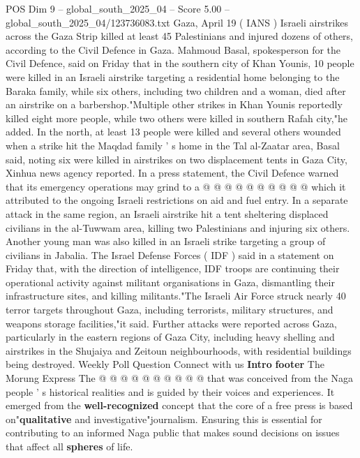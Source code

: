 \begin{textsample}{POS Dim 9 – global\_south\_2025\_04 – Score 5.00 – global\_south\_2025\_04/123736083.txt}  \label{ex:f9_pos_181}
Gaza, April 19 ( IANS ) Israeli airstrikes across the Gaza Strip killed at least 45 Palestinians and injured dozens of others, according to the Civil Defence in Gaza.
Mahmoud Basal, spokesperson for the Civil Defence, said on Friday that in the southern city of Khan Younis, 10 people were killed in an Israeli airstrike targeting a residential home belonging to the Baraka family, while six others, including two children and a woman, died after an airstrike on a barbershop."Multiple other strikes in Khan Younis reportedly killed eight more people, while two others were killed in southern Rafah city,"he added.
In the north, at least 13 people were killed and several others wounded when a strike hit the Maqdad family ' s home in the Tal al-Zaatar area, Basal said, noting six were killed in airstrikes on two displacement tents in Gaza City, Xinhua news agency reported.
In a press statement, the Civil Defence warned that its emergency operations may grind to a @ @ @ @ @ @ @ @ @ @ which it attributed to the ongoing Israeli restrictions on aid and fuel entry.
In a separate attack in the same region, an Israeli airstrike hit a tent sheltering displaced civilians in the al-Tuwwam area, killing two Palestinians and injuring six others.
Another young man was also killed in an Israeli strike targeting a group of civilians in Jabalia.
The Israel Defense Forces ( IDF ) said in a statement on Friday that, with the direction of intelligence, IDF troops are continuing their operational activity against militant organisations in Gaza, dismantling their infrastructure sites, and killing militants."The Israeli Air Force struck nearly 40 terror targets throughout Gaza, including terrorists, military structures, and weapons storage facilities,"it said.
Further attacks were reported across Gaza, particularly in the eastern regions of Gaza City, including heavy shelling and airstrikes in the Shujaiya and Zeitoun neighbourhoods, with residential buildings being destroyed.
Weekly Poll Question Connect with us \textbf{Intro} \textbf{footer} The Morung Express The @ @ @ @ @ @ @ @ @ @ that was conceived from the Naga people ' s historical realities and is guided by their voices and experiences.
It emerged from the \textbf{well-recognized} concept that the core of a free press is based on"\textbf{qualitative} and investigative"journalism.
Ensuring this is essential for contributing to an informed Naga public that makes sound decisions on issues that affect all \textbf{spheres} of life.

\end{textsample}

